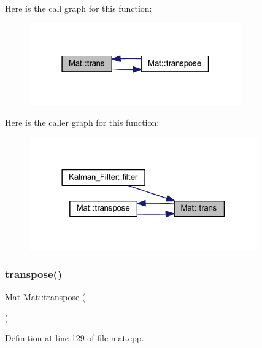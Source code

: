 Here is the call graph for this function\+:
\nopagebreak
\begin{figure}[H]
\begin{center}
\leavevmode
\includegraphics[width=259pt]{class_mat_aa2864c30e68caf29f400bb98295aa6a3_cgraph}
\end{center}
\end{figure}
Here is the caller graph for this function\+:
\nopagebreak
\begin{figure}[H]
\begin{center}
\leavevmode
\includegraphics[width=278pt]{class_mat_aa2864c30e68caf29f400bb98295aa6a3_icgraph}
\end{center}
\end{figure}
\mbox{\label{class_mat_a55e6cc33fc65042a4cff351fe59ae476}} 
\subsubsection{\texorpdfstring{transpose()}{transpose()}}
{\footnotesize\ttfamily \mbox{\hyperlink{class_mat}{Mat}} Mat\+::transpose (\begin{DoxyParamCaption}{ }\end{DoxyParamCaption})}



Definition at line 129 of file mat.\+cpp.

